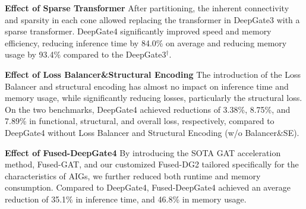 \noindent\textbf{Effect of Sparse Transformer}
After partitioning, the inherent connectivity and sparsity in each cone allowed replacing the transformer in DeepGate3 with a sparse transformer. DeepGate4 significantly improved speed and memory efficiency, reducing inference time by 84.0\% on average and reducing memory usage by 93.4\% compared to the DeepGate3$^\dag$.

\noindent\textbf{Effect of Loss Balancer\&Structural Encoding}
The introduction of the Loss Balancer and structural encoding has almost no impact on inference time and memory usage, while significantly reducing losses, particularly the structural loss. On the two benchmarks, DeepGate4 achieved reductions of 3.38\%, 8.75\%, and 7.89\% in functional, structural, and overall loss, respectively, compared to DeepGate4 without Loss Balancer and Structural Encoding (w/o Balancer\&SE).

\noindent\textbf{Effect of Fused-DeepGate4}
By introducing the SOTA GAT acceleration method, Fused-GAT, and our customized Fused-DG2 tailored specifically for the characteristics of AIGs, we further reduced both runtime and memory consumption. Compared to DeepGate4, Fused-DeepGate4 achieved an average reduction of 35.1\% in inference time, and 46.8\% in memory usage.
